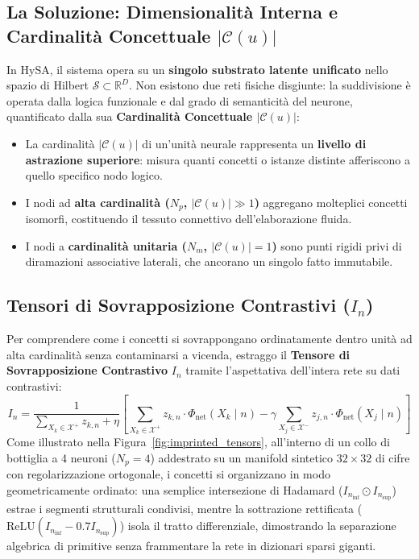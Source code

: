 \documentclass[11pt,a4paper]{article}
\theoremstyle{definition}
\begin{document}
\subsection{La Soluzione: Dimensionalità Interna e Cardinalità Concettuale \texorpdfstring{$|\mathcal{C}(u)|$}{|C(u)|}}

In HySA, il sistema opera su un \textbf{singolo substrato latente unificato} nello spazio di Hilbert $\mathcal{S} \subset \mathbb{R}^D$. Non esistono due reti fisiche disgiunte: la suddivisione è operata dalla logica funzionale e dal grado di semanticità del neurone, quantificato dalla sua \textbf{Cardinalità Concettuale $|\mathcal{C}(u)|$}:

\begin{itemize}[leftmargin=*, itemsep=2.0pt]
    \item La cardinalità $|\mathcal{C}(u)|$ di un'unità neurale rappresenta un \textbf{livello di astrazione superiore}: misura quanti concetti o istanze distinte afferiscono a quello specifico nodo logico.
    \item I nodi ad \textbf{alta cardinalità ($N_p$, $|\mathcal{C}(u)| \gg 1$)} aggregano molteplici concetti isomorfi, costituendo il tessuto connettivo dell'elaborazione fluida.
    \item I nodi a \textbf{cardinalità unitaria ($N_m$, $|\mathcal{C}(u)|=1$)} sono punti rigidi privi di diramazioni associative laterali, che ancorano un singolo fatto immutabile.
\end{itemize}

\subsection{Tensori di Sovrapposizione Contrastivi \texorpdfstring{($I_n$)}{(In)}}

Per comprendere come i concetti si sovrappongano ordinatamente dentro unità ad alta cardinalità senza contaminarsi a vicenda, estraggo il \textbf{Tensore di Sovrapposizione Contrastivo} $I_n$ tramite l'aspettativa dell'intera rete su dati contrastivi:
\begin{equation}
    I_n = \frac{1}{\sum_{X_k \in \mathcal{X}^+} z_{k,n} + \eta} \left[ \sum_{X_k \in \mathcal{X}^+} z_{k,n} \cdot \Phi_{\mathrm{net}}(X_k \mid n) - \gamma \sum_{X_j \in \mathcal{X}^-} z_{j,n} \cdot \Phi_{\mathrm{net}}(X_j \mid n) \right]
    \label{eq:imprinted_tensor}
\end{equation}
Come illustrato nella Figura~\ref{fig:imprinted_tensors}, all'interno di un collo di bottiglia a 4 neuroni ($N_p=4$) addestrato su un manifold sintetico $32 \times 32$ di cifre con regolarizzazione ortogonale, i concetti si organizzano in modo geometricamente ordinato: una semplice intersezione di Hadamard ($I_{n_{\mathrm{inf}}} \odot I_{n_{\mathrm{sup}}}$) estrae i segmenti strutturali condivisi, mentre la sottrazione rettificata ($\mathrm{ReLU}(I_{n_{\mathrm{inf}}} - 0.7 I_{n_{\mathrm{sup}}})$) isola il tratto differenziale, dimostrando la separazione algebrica di primitive senza frammentare la rete in dizionari sparsi giganti.
\end{document}
